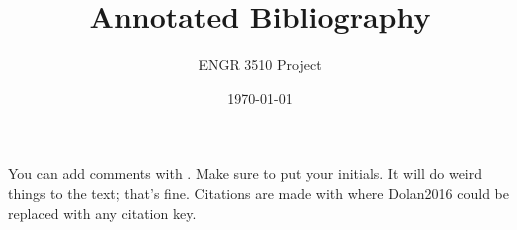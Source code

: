 \documentclass[12pt,letterpaper]{article}
\begin{document}
\title{Annotated Bibliography}
\author{ENGR 3510 Project}
\date{\today}
\maketitle

You can add comments with . Make sure to put your initials. It will do weird things to the text; that's fine. 
Citations are made with \cite{Dolan2016} where Dolan2016 could be replaced with any citation key. 



\end{document}
